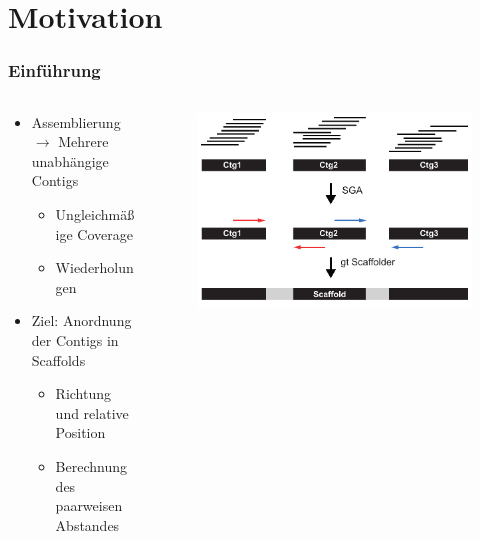 \documentclass[xcolor=pst]{beamer}
\begin{document}
\section{Motivation}
\begin{frame}
\setcounter{framenumber}{1}
  \frametitle{Einführung}

  \begin{columns} %
    \begin{column}{.45\textwidth}
      \begin{itemize}
      \item Assemblierung $\rightarrow$ Mehrere unabhängige Contigs
      \begin{itemize}
        \item Ungleichmäßige Coverage
        \item Wiederholungen
      \end{itemize}
      \item Ziel: Anordnung der Contigs in Scaffolds
      \begin{itemize}
        \item Richtung und relative Position
        \item Berechnung des paarweisen Abstandes
      \end{itemize}
      \end{itemize}
    \end{column}
    \begin{column}{.45\textwidth}
      \begin{center}
        \begin{figure}[t]
          \includegraphics[width=\textwidth,height=0.8\textheight,keepaspectratio]{figures/Scaffolding.pdf}
        \end{figure}
      \end{center}
    \end{column}
  \end{columns}
\end{frame}
\end{document}
